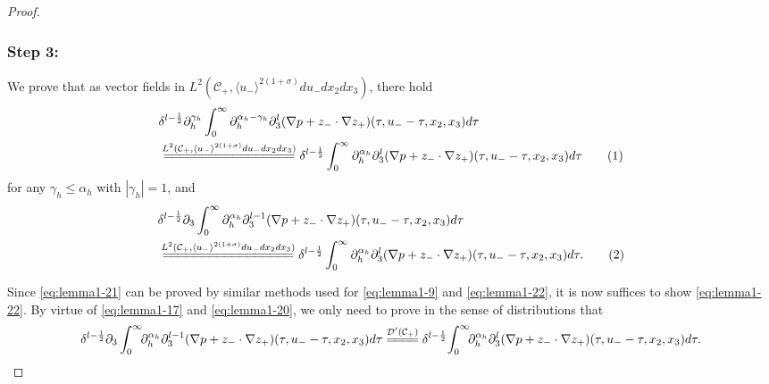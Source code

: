 \documentclass[10pt,reqno]{amsart}
\numberwithin{equation}{section}
\begin{document}
\begin{proof}
 
	
	
	\subsubsection*{\bf Step 3:} We prove that  as vector fields in $L^2(\mathcal{C}_+,\langle u_{-}\rangle^{2(1+\sigma)} du_-dx_2dx_3)$, 
	there hold
	\begin{align*}
		& 
		\delta^{l-\frac{1}{2}}\partial_h^{\gamma_h}\int_0^{\infty} \partial_h^{\alpha_h-\gamma_h}\partial_3^l(\nabla p+z_{-}\cdot\nabla z_{+}) 
		(\tau,u_--\tau,x_2,x_3)d\tau\\
		&\stackrel{ L^2(\mathcal{C}_+,\langle u_-\rangle^{2(1+\sigma)}du_-dx_2dx_3)}{=\joinrel=\joinrel=\joinrel=\joinrel=\joinrel=\joinrel=\joinrel=\joinrel=\joinrel=\joinrel=\joinrel=\joinrel=\joinrel=\joinrel=\joinrel=\joinrel=}\delta^{l-\frac{1}{2}}\int_0^{\infty} \partial_h^{\alpha_h}\partial_3^l(\nabla p+z_{-}\cdot\nabla z_{+}) 
		(\tau,u_--\tau,x_2,x_3)d\tau\stepcounter{equation}\tag{\theequation}\label{eq:lemma1-21}
	\end{align*}
	for any $\gamma_h\leqslant\alpha_h$ with $|\gamma_h|=1$, and 
		\begin{align*}
		& 
		\delta^{l-\frac{1}{2}}\partial_3\int_0^{\infty} \partial_h^{\alpha_h}\partial_3^{l-1}(\nabla p+z_{-}\cdot\nabla z_{+}) 
		(\tau,u_--\tau,x_2,x_3)d\tau\\
		&\stackrel{ L^2(\mathcal{C}_+,\langle u_-\rangle^{2(1+\sigma)}du_-dx_2dx_3)}{=\joinrel=\joinrel=\joinrel=\joinrel=\joinrel=\joinrel=\joinrel=\joinrel=\joinrel=\joinrel=\joinrel=\joinrel=\joinrel=\joinrel=\joinrel=\joinrel=}\delta^{l-\frac{1}{2}}\int_0^{\infty} \partial_h^{\alpha_h}\partial_3^l(\nabla p+z_{-}\cdot\nabla z_{+}) 
		(\tau,u_--\tau,x_2,x_3)d\tau.\stepcounter{equation}\tag{\theequation}\label{eq:lemma1-22}
	\end{align*}

Since \eqref{eq:lemma1-21} can be proved by similar methods used for  \eqref{eq:lemma1-9} and \eqref{eq:lemma1-22}, it is now suffices to show \eqref{eq:lemma1-22}. 
By virtue of \eqref{eq:lemma1-17} and  \eqref{eq:lemma1-20}, we only need to prove in the sense of distributions that 
	\begin{equation}\label{eq:lemma1-23}
		\delta^{l-\frac{1}{2}}\partial_3\int_0^{\infty}\!\! \partial_h^{\alpha_h}\partial_3^{l-1}(\nabla p+z_{-}\cdot\nabla z_{+}) 
		(\tau,u_--\tau,x_2,x_3)d\tau
		\stackrel{ \mathcal{D}'(\mathcal{C}_+)}{=\joinrel=\joinrel=\joinrel=}\delta^{l-\frac{1}{2}}\!\int_0^{\infty}\!\! \partial_h^{\alpha_h}\partial_3^l(\nabla p+z_{-}\cdot\nabla z_{+}) 
		(\tau,u_--\tau,x_2,x_3)d\tau. 
	\end{equation}


\end{proof}
\end{document}
